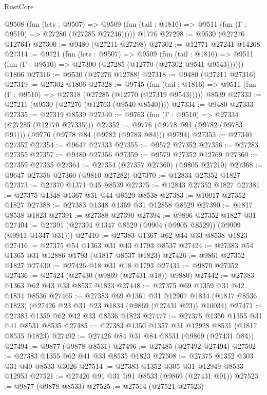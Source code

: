 \begin{lexlean}{RustCore}
\begin{coremodule}
    @9508
      (fun (lets : @9507) =>
      @9509 (fun (tail : @1816) => @9511 (fun (Γ : @9510) => @27280 (@27285 @27246)))))
    @1776
@27298 := @9530 (@27276 @12764)
@27300 := @9480 (@27211 @27298)
@27302 := @12771 @27241 @14268
@27314 := @9721
    (fun (lets : @9507) =>
    @9509
      (fun (tail : @1816) =>
      @9511 (fun (Γ : @9510) => @27300 (@27285 (@12770 (@27302 @9541 @9543))))))
    @1806
@27316 := @9530 (@27276 @12788)
@27318 := @9480 (@27211 @27316)
@27319 := @27302 @1806
@27328 := @9745
    (fun (tail : @1816) => @9511 (fun (Γ : @9510) => @27318 (@27285 (@12770 (@27319 @9543)))))
    @8539
@27333 := @27211 (@9530 (@27276 (@12763 (@9540 @8540))))
@27334 := @9480 @27333
@27335 := @27319 @8539
@27340 := @9763 (fun (Γ : @9510) => @27334 (@27285 (@12770 @27335)))
@27352 := @9776 (@9778 @91 (@9782 (@9783 @91))) (@9776 (@9778 @84 (@9782 (@9783 @84))) @9794)
@27353 := @27340 @27352
@27354 := @9647 @27333
@27355 := @9572 @27352
@27356 := @27283 @27355
@27357 := @9480 @27356
@27359 := @9579 @27352 @12769
@27360 := @27359 @27335
@27364 := @27354 (@27357 @27360) (@9805 @27210)
@27368 := @9647 @27356 @27360 (@9810 @27282)
@27370 := @12834 @27352 @1827
@27373 := @27370 @1371 @45 @8539
@27375 := @12843 @27352 @1827
@27381 := @27375 @1348 @1367 @31 @44 @8529 @8538
@27383 := @10017 @27352 @1827
@27388 := @27383 @1348 @1369 @31 @12858 @8529
@27390 := @1817 @8538 @1823
@27391 := @27388 @27390
@27394 := @9896 @27352 @1827 @31
@27404 := @27391 (@27394 @1347 @8529 (@9904 (@9905 @8529)) (@9909 (@9911 @1347 @31)))
@27410 := @27383 @1367 @62 @44 @33 @8538 @1823
@27416 := @27375 @54 @1363 @31 @43 @1793 @8537
@27424 := @27383 @54 @1365 @31 @12886 @1793 (@1817 @8537 @1823)
@27426 := @9861 @27352 @1827
@27430 := @27426 @18 @31 @18 @1793
@27431 := @9870 @27352
@27436 := @27424 (@27430 (@9869 (@27431 @18)) @9880)
@27442 := @27383 @1363 @62 @43 @33 @8537 @1823
@27448 := @27375 @69 @1359 @31 @42 @1834 @8536
@27465 := @27383
    @69
    @1361
    @31
    @12907
    @1834
    (@1817 @8536 @1823)
    (@27426 @23 @31 @23 @1834 (@9869 (@27431 @23)) @10034)
@27471 := @27383 @1359 @62 @42 @33 @8536 @1823
@27477 := @27375 @1350 @1355 @31 @41 @8531 @8535
@27485 := @27383 @1350 @1357 @31 @12928 @8531 (@1817 @8535 @1823)
@27492 := @27426 @84 @31 @84 @8531 (@9869 (@27431 @84))
@27494 := @9877 (@9878 @8531)
@27496 := @27485 (@27492 @27494)
@27502 := @27383 @1355 @62 @41 @33 @8535 @1823
@27508 := @27375 @1352 @303 @31 @40 @8533 @3026
@27514 := @27383 @1352 @305 @31 @12949 @8533 @12953
@27521 := @27426 @91 @31 @91 @8533 (@9869 (@27431 @91))
@27523 := @9877 (@9878 @8533)
@27525 := @27514 (@27521 @27523)

\end{coremodule}
\end{lexlean}
